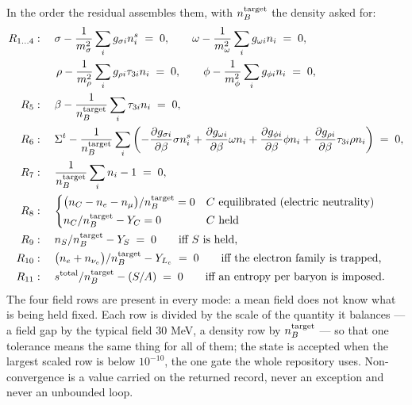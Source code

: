 \documentclass[aps,prc,onecolumn,superscriptaddress,nofootinbib,10pt]{revtex4-2}
\newcommand{\nB}{n_B}
\newcommand{\nC}{n_C}
\newcommand{\nS}{n_S}
\newcommand{\Sigmat}{\Sigma^{t}}
\begin{document}
In the order the residual assembles them, with $\nB^{\rm target}$ the density
asked for:
\begin{align}
  R_{1\ldots4} &: \quad \sigma - \frac{1}{m_\sigma^2}\sum_i g_{\sigma i} n^s_i
                  \;=\; 0 , \qquad
                  \omega - \frac{1}{m_\omega^2}\sum_i g_{\omega i} n_i \;=\; 0 ,
                  \nonumber \\
               &\qquad \rho - \frac{1}{m_\rho^2}\sum_i g_{\rho i}\tau_{3i} n_i
                  \;=\; 0 , \qquad
                  \phi - \frac{1}{m_\phi^2}\sum_i g_{\phi i} n_i \;=\; 0 ,
  \label{eq:rowfields} \\
  R_5 &: \quad \beta - \frac{1}{\nB^{\rm target}}\sum_i \tau_{3i} n_i \;=\; 0 ,
  \label{eq:rowbeta} \\
  R_6 &: \quad \Sigmat - \frac{1}{\nB^{\rm target}}\sum_i
               \left( -\frac{\partial g_{\sigma i}}{\partial\beta}\sigma n^s_i
                    + \frac{\partial g_{\omega i}}{\partial\beta}\omega n_i
                    + \frac{\partial g_{\phi i}}{\partial\beta}\phi n_i
                    + \frac{\partial g_{\rho i}}{\partial\beta}
                      \tau_{3i}\rho n_i \right) \;=\; 0 ,
  \label{eq:rowsigmat} \\
  R_7 &: \quad \frac{1}{\nB^{\rm target}}\sum_i n_i - 1 \;=\; 0 ,
  \label{eq:rownb} \\
  R_8 &: \quad
    \begin{cases}
      \big(\nC - n_e - n_\mu\big)/\nB^{\rm target} = 0
        & \text{$C$ equilibrated (electric neutrality)} \\[2pt]
      \nC/\nB^{\rm target} - Y_C = 0 & \text{$C$ held}
    \end{cases}
  \label{eq:rowcharge} \\
  R_9 &: \quad \nS/\nB^{\rm target} - Y_S \;=\; 0
        \qquad \text{iff $S$ is held,}
  \label{eq:rowS} \\
  R_{10} &: \quad \big(n_e + n_{\nu_e}\big)/\nB^{\rm target} - Y_{L_e} \;=\; 0
        \qquad \text{iff the electron family is trapped,}
  \label{eq:rowLe} \\
  R_{11} &: \quad s^{\rm total}/\nB^{\rm target} - (S/A) \;=\; 0
        \qquad \text{iff an entropy per baryon is imposed.}
  \label{eq:rowS_A}
\end{align}
The four field rows are present in every mode: a mean field does not know what
is being held fixed. Each row is divided by the scale of the quantity it
balances --- a field gap by the typical field $30$ MeV, a density row by
$\nB^{\rm target}$ --- so that one tolerance means the same thing for all of
them; the state is accepted when the largest scaled row is below $10^{-10}$,
the one gate the whole repository uses. Non-convergence is a value carried
on the returned record, never an exception and never an unbounded loop.
\end{document}
